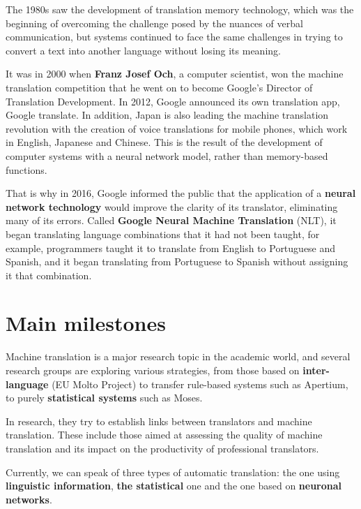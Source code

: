 \documentclass[a4paper]{article}
\theoremstyle{plain}
\theoremstyle{definition}
\begin{document}
    The 1980s saw the development of translation memory technology, which was the beginning of overcoming the challenge posed by the nuances of verbal communication, but systems continued to face the same challenges in trying to convert a text into another language without losing its meaning.\newline
    
    It was in 2000 when \textbf{Franz Josef Och}, a computer scientist, won the machine translation competition that he went on to become Google's Director of Translation Development. In 2012, Google announced its own translation app, Google translate. In addition, Japan is also leading the machine translation revolution with the creation of voice translations for mobile phones, which work in English, Japanese and Chinese. This is the result of the development of computer systems with a neural network model, rather than memory-based functions.\newline
    
    That is why in 2016, Google informed the public that the application of a \textbf{neural network technology }would improve the clarity of its translator, eliminating many of its errors. Called \textbf{Google Neural Machine Translation} (NLT), it began translating language combinations that it had not been taught, for example, programmers taught it to translate from English to Portuguese and Spanish, and it began translating from Portuguese to Spanish without assigning it that combination.
    
    
    

    \section{Main milestones}
	\label{sec:examples}
	Machine translation is a major research topic in the academic world, and several research groups are exploring various strategies, from those based on \textbf{inter-language} (EU Molto Project) to transfer rule-based systems such as Apertium, to purely \textbf{statistical systems} such as Moses.\newline

    In research, they try to establish links between translators and machine translation. These include those aimed at assessing the quality of machine translation and its impact on the productivity of professional translators.\newline

    Currently, we can speak of three types of automatic translation: the one using \textbf{linguistic information}, \textbf{the statistical} one and the one based on \textbf{neuronal networks}. 
\end{document}
